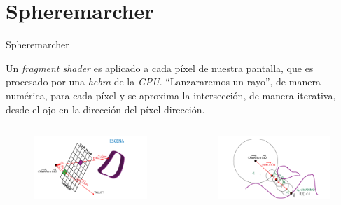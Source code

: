\section{Spheremarcher}
\SectionPage


\begin{frame}{Spheremarcher}

    Un \textit{fragment shader} es aplicado a cada píxel de nuestra pantalla, que es procesado por una \textit{hebra} de la \textit{GPU}. \enquote{Lanzararemos un rayo}, de manera numérica, para cada píxel y se aproxima la intersección, de manera iterativa, desde el ojo en la dirección del píxel dirección.
    
    \vfill

    \begin{columns}[onlytextwidth]
        \begin{column}{0.50\textwidth}
            \begin{figure}[H]
              \centering
              \includegraphics[width=1.0\textwidth]{imagenes/gpu.png}
            \end{figure}
        \end{column}
        
        \begin{column}{0.50\textwidth}
            \begin{figure}[H]
              \centering
              \includegraphics[width=1.0\textwidth]{imagenes/spheremarching.png}
            \end{figure}
        \end{column}
        

\end{columns}
\end{frame}
